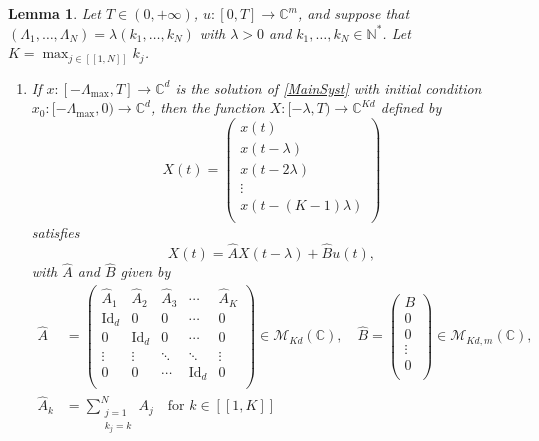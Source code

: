 \documentclass[10pt]{amsart}
\newcommand{\llbracket}{[\![}
\newcommand{\rrbracket}{]\!]}
\theoremstyle{plain}
\newtheorem{lemm}[theo]{Lemma}
\theoremstyle{definition}
\DeclareMathOperator{\id}{Id}
\begin{document}
\begin{lemm}
\label{LemmAAugm}
Let $T \in (0, +\infty)$, $u: [0, T] \to \mathbb C^m$, and suppose that $(\Lambda_1, \dots, \Lambda_N) = \lambda (k_1, \dots, k_N)$ with $\lambda > 0$ and $k_1, \dots,  k_N \in \mathbb N^\ast$. Let $K = \max_{j \in \llbracket 1, N\rrbracket} k_j$.
\begin{enumerate}
\item If $x: [-\Lambda_{\max}, T] \to \mathbb C^d$ is the solution of \eqref{MainSyst} with initial condition $x_0: [-\Lambda_{\max}, 0) \to \mathbb C^d$, then the function $X: [-\lambda, T) \to \mathbb C^{K d}$ defined by
\begin{equation}
\label{AugmX}
X(t) = \begin{pmatrix}
x(t) \\
x(t - \lambda) \\
x(t - 2\lambda) \\
\vdots \\
x(t - (K-1)\lambda) \\
\end{pmatrix}
\end{equation}
satisfies
\begin{equation}
\label{AugmSyst}
X(t) = \widehat A X(t - \lambda) + \widehat B u(t),
\end{equation}
with $\widehat A$ and $\widehat B$ given by
\begin{equation}
\label{AugmMat}
\begin{aligned}
\widehat A & = \begin{pmatrix}
\widehat A_1 & \widehat A_2 & \widehat A_3 & \cdots & \widehat A_K \\
\id_d & 0 & 0 & \cdots & 0 \\
0 & \id_d & 0 & \cdots & 0 \\
\vdots & \vdots & \ddots & \ddots & \vdots \\
0 & 0 & \cdots & \id_d & 0 \\
\end{pmatrix} \in \mathcal M_{Kd}(\mathbb C), \quad \widehat B = \begin{pmatrix}
B \\
0 \\
0 \\
\vdots \\
0 \\
\end{pmatrix} \in \mathcal M_{K d, m}(\mathbb C),\\
\widehat A_k & = \sum_{\substack{j = 1 \\ k_j = k}}^N A_j \quad \text{for } k \in \llbracket 1, K\rrbracket\\[-18pt]

\end{aligned}
\end{equation}
\end{enumerate}
\end{lemm}
\end{document}
